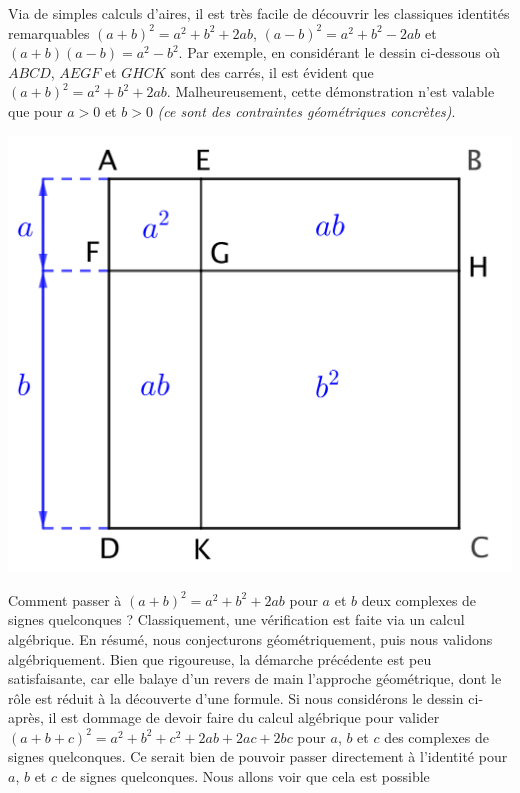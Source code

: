 Via de simples calculs d'aires, il est très facile de découvrir les classiques identités remarquables
$(a + b)^2 = a^2 + b^2 + 2ab$,
$(a - b)^2 = a^2 + b^2 - 2ab$
et
$(a + b)(a - b) = a^2 - b^2$.
%
Par exemple, en considérant le dessin ci-dessous où $ABCD$, $AEGF$ et $GHCK$ sont des carrés,
il est évident que $(a + b)^2 = a^2 + b^2 + 2 ab$.
Malheureusement, cette démonstration n'est valable que pour $a > 0$ et $b > 0$ \emph{(ce sont des contraintes géométriques concrètes)}.

\begin{center}
	\includegraphics[scale = .7]{(a+b)^2.png}
\end{center}


Comment passer à $(a + b)^2 = a^2 + b^2 + 2 ab$ pour $a$ et $b$ deux complexes de signes quelconques ?
Classiquement, une vérification est faite via un calcul algébrique.
%
En résumé, nous conjecturons géométriquement, puis nous validons algébriquement.
%
Bien que rigoureuse, la démarche précédente est peu satisfaisante, car elle balaye d'un revers de main l'approche géométrique, dont le rôle est réduit à la découverte d'une formule.
Si nous considérons le dessin ci-après, il est dommage de devoir faire du calcul algébrique pour valider $(a + b + c)^2 = a^2 + b^2 + c^2 + 2 ab + 2 ac + 2 bc$ pour $a$, $b$ et $c$ des complexes de signes quelconques.
Ce serait bien de pouvoir passer directement à l'identité pour $a$, $b$ et $c$ de signes quelconques.
Nous allons voir que cela est possible


